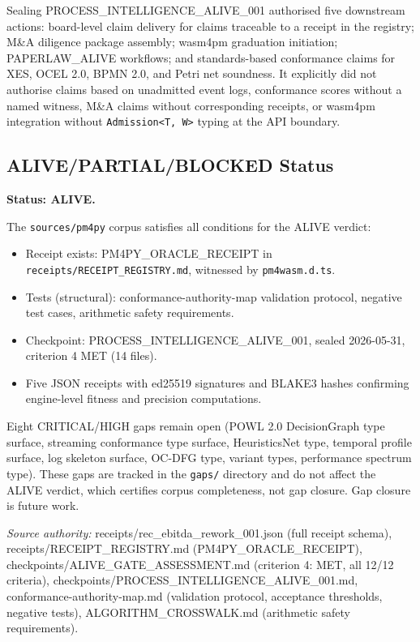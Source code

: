 Sealing PROCESS\_INTELLIGENCE\_ALIVE\_001 authorised five downstream actions: board-level
claim delivery for claims traceable to a receipt in the registry; M\&A diligence package
assembly; wasm4pm graduation initiation; PAPERLAW\_ALIVE workflows; and standards-based
conformance claims for XES, OCEL 2.0, BPMN 2.0, and Petri net soundness. It explicitly
did not authorise claims based on unadmitted event logs, conformance scores without a
named witness, M\&A claims without corresponding receipts, or wasm4pm integration without
\texttt{Admission<T, W>} typing at the API boundary.

\subsection{ALIVE/PARTIAL/BLOCKED Status}
\label{sec:sources-pm4py-evidence-status}

\textbf{Status: ALIVE.}

The \texttt{sources/pm4py} corpus satisfies all conditions for the ALIVE verdict:
\begin{itemize}
  \item Receipt exists: PM4PY\_ORACLE\_RECEIPT in \texttt{receipts/RECEIPT\_REGISTRY.md},
    witnessed by \texttt{pm4wasm.d.ts}.
  \item Tests (structural): conformance-authority-map validation protocol, negative test
    cases, arithmetic safety requirements.
  \item Checkpoint: PROCESS\_INTELLIGENCE\_ALIVE\_001, sealed 2026-05-31, criterion 4
    MET (14 files).
  \item Five JSON receipts with ed25519 signatures and BLAKE3 hashes confirming
    engine-level fitness and precision computations.
\end{itemize}

Eight CRITICAL/HIGH gaps remain open (POWL 2.0 DecisionGraph type surface, streaming
conformance type surface, HeuristicsNet type, temporal profile surface, log skeleton
surface, OC-DFG type, variant types, performance spectrum type). These gaps are tracked
in the \texttt{gaps/} directory and do not affect the ALIVE verdict, which certifies
corpus completeness, not gap closure. Gap closure is future work.

\bigskip
\noindent\textit{Source authority:} receipts/rec\_ebitda\_rework\_001.json (full receipt
schema), receipts/RECEIPT\_REGISTRY.md (PM4PY\_ORACLE\_RECEIPT), checkpoints/ALIVE\_GATE\_ASSESSMENT.md
(criterion 4: MET, all 12/12 criteria), checkpoints/PROCESS\_INTELLIGENCE\_ALIVE\_001.md,
conformance-authority-map.md (validation protocol, acceptance thresholds, negative tests),
ALGORITHM\_CROSSWALK.md (arithmetic safety requirements).

